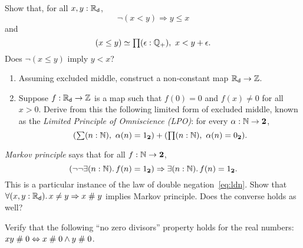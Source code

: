 \begin{ex}
  Show that, for all $x, y : \mathbb{R}_\mathsf{d}$,
  \begin{equation*}
    \lnot (x < y) \Rightarrow y \leq x
  \end{equation*}
  and
  \begin{equation*}
    \eqv{(x \leq y)}{\prd{\epsilon : \Qp} x < y + \epsilon}.
  \end{equation*}
  Does $\lnot (x \leq y)$ imply $y < x$?
\end{ex}

\begin{ex} \label{ex:reals-non-constant-into-Z}
  \mbox{}
  \begin{enumerate}
  \item 
    Assuming excluded middle, construct a non-constant map $\mathbb{R}_\mathsf{d} \to \mathbb{Z}$.
  \item 
    Suppose $f : \mathbb{R}_\mathsf{d} \to \mathbb{Z}$ is a map such that $f(0) = 0$ and $f(x) \neq 0$ for all $x >
    0$. Derive from this the following limited form of excluded middle, known as the
    \emph{Limited Principle of Omniscience (LPO)}: for every $\alpha : \mathbb{N} \to \mathbf{2}$,
    \begin{equation*}
      (\sm{n : \N} \alpha(n) = \btrue) + (\prd{n : \N} \alpha(n) = \bfalse).
    \end{equation*}
  \end{enumerate}
\end{ex}

\begin{ex} \label{ex:reals-apart-neq-MP}
  \emph{Markov principle} says that for all $f : \mathbb{N} \to \mathbf{2}$,
  \begin{equation*}
    (\lnot \lnot \exis{n : \nat} f(n) = \btrue)
    \Rightarrow
    \exis{n : \nat} f(n) = \btrue.
  \end{equation*}
  This is a particular instance of the law of double negation~\eqref{eq:ldn}. Show that
  $\fall{x, y: \RD} x \neq y \Rightarrow x \apart y$ implies Markov principle. Does the
  converse holds as well?
\end{ex}

\begin{ex} \label{ex:reals-apart-zero-divisors}
  Verify that the following ``no zero divisors'' property holds for the real numbers:
  $x y \mathrel{\#} 0 \Leftrightarrow x \mathrel{\#} 0 \land y \mathrel{\#} 0$.
\end{ex}


